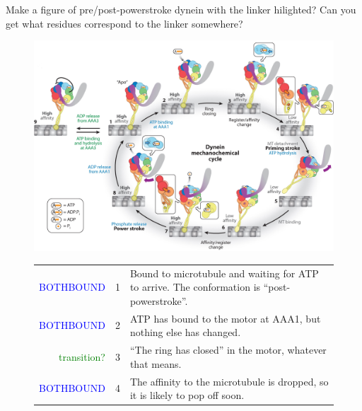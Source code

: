 \documentclass[10pt]{article} %
\begin{document}
Make a figure of pre/post-powerstroke dynein with the linker hilighted? Can you get what residues correspond to the linker somewhere?

\begin{figure}[h!]
  \centering
  \includegraphics[width=.90\textwidth,keepaspectratio]{../../figures/mechanochemical-cycle.jpeg}
  \newcommand\bothbound{\textcolor{blue}{BOTHBOUND}}
  \newcommand\onebound{\textcolor{red}{ONEBOUND}}
  \newcommand\transition{\textcolor{green}{transition?}}
  \begin{tabular}{rll}
    \bothbound &
    1 & \begin{minipage}{5in}
      Bound to microtubule and waiting for ATP to arrive.  The
      conformation is ``post-powerstroke''.
    \end{minipage}\vspace{0.5em}\\
    \bothbound &
    2 & \begin{minipage}{5in}
      ATP has bound to the motor at AAA1, but nothing else has changed.
    \end{minipage}\vspace{0.5em}\\
    \transition &
    3 & \begin{minipage}{5in}
      ``The ring has closed'' in the motor, whatever that means.
    \end{minipage}\vspace{0.5em}\\
    \bothbound &
    4 & \begin{minipage}{5in}
      The affinity to the microtubule is dropped, so it is likely to pop off soon.
    \end{minipage}\vspace{0.5em}\\

\end{tabular}
\end{figure}
\end{document}
